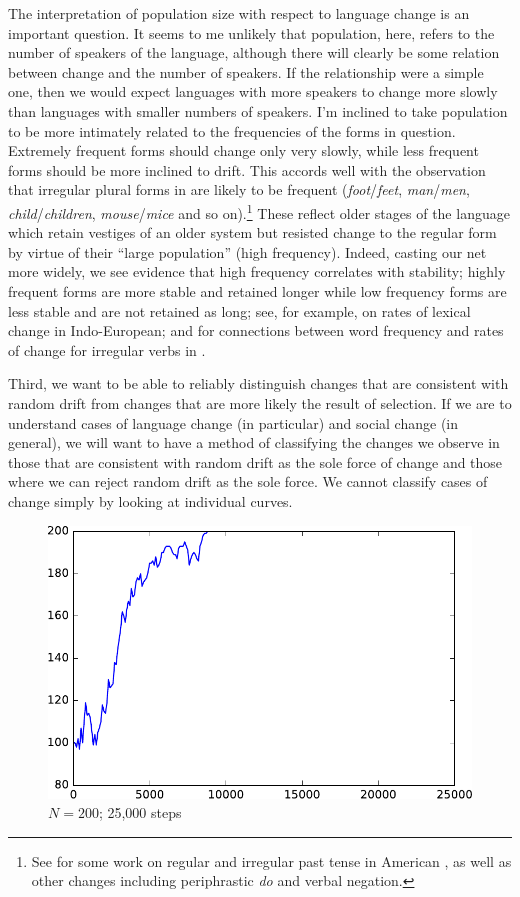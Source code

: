 \documentclass[output=paper]{langsci/langscibook}
\begin{document}
The interpretation of population size with respect to language change
is an important question.  It seems to me unlikely that population,
here, refers to the number of speakers of the language, although there
will clearly be some relation between change and the number of
speakers.  If the relationship were a simple one, then we would expect
languages with more speakers to change more slowly than languages with
smaller numbers of speakers.  I'm inclined to take population to be
more intimately related to the frequencies of the forms in question.
Extremely frequent forms should change only very slowly, while less
frequent forms should be more inclined to drift.  This accords well
with the observation that irregular plural forms in  are likely
to be frequent (\emph{foot}/\emph{feet}, \emph{man}/\emph{men},
\emph{child}/\emph{children}, \emph{mouse}/\emph{mice} and so on).\footnote{See
\citet{newberry-etal:2017} for some work on regular and irregular past tense in
American , as well as other changes including periphrastic
\emph{do} and verbal negation.}  These reflect older stages of the language
which retain vestiges of an older system but resisted change to the regular
form by virtue of their ``large population'' (high frequency).  Indeed, casting
our net more widely, we see evidence that high frequency correlates with
stability; highly frequent forms are more stable and retained longer while low
frequency forms are less stable and are not retained as long;  see, for
example, \citet{pagel-etal:2007} on rates of lexical change in Indo-European;
\citet{lieberman-etal:2007} and \citet{newberry-etal:2017} for connections
between word frequency and rates of change for irregular verbs in
.

Third, we want to be able to reliably distinguish changes that are
consistent with random drift from changes that are more likely the
result of selection.  If we are to understand cases of language change
(in particular) and social change (in general), we will want to have
a method of classifying the changes we observe in those that are
consistent with random drift as the sole force of change and those
where we can reject random drift as the sole force.   We cannot
classify cases of change simply by looking at individual curves.

\begin{figure}
    \includegraphics[width=.75\linewidth]{img/result.pdf}
    \caption{$N = 200$; 25,000 steps\label{RandomDrift}}
\end{figure}
\end{document}
